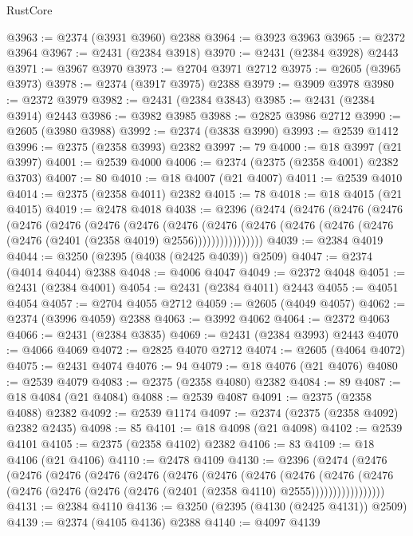 \begin{lexlean}{RustCore}
\begin{coremodule}
@3963 := @2374 (@3931 @3960) @2388
@3964 := @3923 @3963
@3965 := @2372 @3964
@3967 := @2431 (@2384 @3918)
@3970 := @2431 (@2384 @3928) @2443
@3971 := @3967 @3970
@3973 := @2704 @3971 @2712
@3975 := @2605 (@3965 @3973)
@3978 := @2374 (@3917 @3975) @2388
@3979 := @3909 @3978
@3980 := @2372 @3979
@3982 := @2431 (@2384 @3843)
@3985 := @2431 (@2384 @3914) @2443
@3986 := @3982 @3985
@3988 := @2825 @3986 @2712
@3990 := @2605 (@3980 @3988)
@3992 := @2374 (@3838 @3990)
@3993 := @2539 @1412
@3996 := @2375 (@2358 @3993) @2382
@3997 := 79
@4000 := @18 @3997 (@21 @3997)
@4001 := @2539 @4000
@4006 := @2374 (@2375 (@2358 @4001) @2382 @3703)
@4007 := 80
@4010 := @18 @4007 (@21 @4007)
@4011 := @2539 @4010
@4014 := @2375 (@2358 @4011) @2382
@4015 := 78
@4018 := @18 @4015 (@21 @4015)
@4019 := @2478 @4018
@4038 := @2396
    (@2474
      (@2476
        (@2476
          (@2476
            (@2476
              (@2476
                (@2476
                  (@2476
                    (@2476
                      (@2476
                        (@2476
                          (@2476 (@2476 (@2476 (@2476 (@2401 (@2358 @4019) @2556))))))))))))))))
@4039 := @2384 @4019
@4044 := @3250 (@2395 (@4038 (@2425 @4039)) @2509)
@4047 := @2374 (@4014 @4044) @2388
@4048 := @4006 @4047
@4049 := @2372 @4048
@4051 := @2431 (@2384 @4001)
@4054 := @2431 (@2384 @4011) @2443
@4055 := @4051 @4054
@4057 := @2704 @4055 @2712
@4059 := @2605 (@4049 @4057)
@4062 := @2374 (@3996 @4059) @2388
@4063 := @3992 @4062
@4064 := @2372 @4063
@4066 := @2431 (@2384 @3835)
@4069 := @2431 (@2384 @3993) @2443
@4070 := @4066 @4069
@4072 := @2825 @4070 @2712
@4074 := @2605 (@4064 @4072)
@4075 := @2431 @4074
@4076 := 94
@4079 := @18 @4076 (@21 @4076)
@4080 := @2539 @4079
@4083 := @2375 (@2358 @4080) @2382
@4084 := 89
@4087 := @18 @4084 (@21 @4084)
@4088 := @2539 @4087
@4091 := @2375 (@2358 @4088) @2382
@4092 := @2539 @1174
@4097 := @2374 (@2375 (@2358 @4092) @2382 @2435)
@4098 := 85
@4101 := @18 @4098 (@21 @4098)
@4102 := @2539 @4101
@4105 := @2375 (@2358 @4102) @2382
@4106 := 83
@4109 := @18 @4106 (@21 @4106)
@4110 := @2478 @4109
@4130 := @2396
    (@2474
      (@2476
        (@2476
          (@2476
            (@2476
              (@2476
                (@2476
                  (@2476
                    (@2476
                      (@2476
                        (@2476
                          (@2476
                            (@2476 (@2476 (@2476 (@2476 (@2401 (@2358 @4110) @2555)))))))))))))))))
@4131 := @2384 @4110
@4136 := @3250 (@2395 (@4130 (@2425 @4131)) @2509)
@4139 := @2374 (@4105 @4136) @2388
@4140 := @4097 @4139

\end{coremodule}
\end{lexlean}
